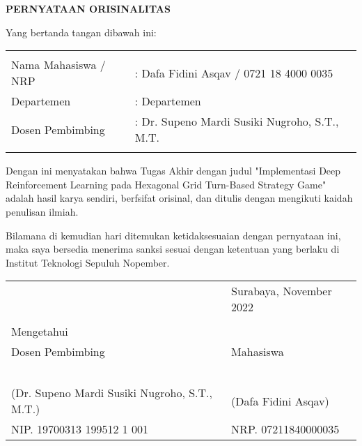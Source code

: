 \begin{center}
  \large
  \textbf{PERNYATAAN ORISINALITAS}
\end{center}

\thispagestyle{empty}

\vspace{2ex}


\noindent Yang bertanda tangan dibawah ini:

\noindent\begin{tabularx}{\textwidth}{X X l}
  & \\
  Nama Mahasiswa / NRP &: Dafa Fidini Asqav / 0721 18 4000 0035 \\
  Departemen &: Departemen \\
  Dosen Pembimbing &: Dr. Supeno Mardi Susiki Nugroho, S.T., M.T.  \\
  & \\
\end{tabularx}

Dengan ini menyatakan bahwa Tugas Akhir dengan judul "Implementasi Deep Reinforcement Learning pada Hexagonal Grid Turn-Based Strategy Game" adalah hasil karya sendiri, berfsifat orisinal, dan ditulis dengan mengikuti kaidah penulisan ilmiah.

Bilamana di kemudian hari ditemukan ketidaksesuaian dengan pernyataan ini, maka saya bersedia menerima sanksi sesuai dengan ketentuan yang berlaku di Institut Teknologi Sepuluh Nopember.

\vspace{8ex}

\noindent\begin{tabularx}{\textwidth}{X l}
  & Surabaya, November 2022\\
  & \\
  Mengetahui & \\
  Dosen Pembimbing & Mahasiswa\\
  & \\
  & \\
  & \\
  & \\
  & \\
  (Dr. Supeno Mardi Susiki Nugroho, S.T., M.T.) & (Dafa Fidini Asqav) \\
  NIP. 19700313 199512 1 001 & NRP. 07211840000035 \\
\end{tabularx}